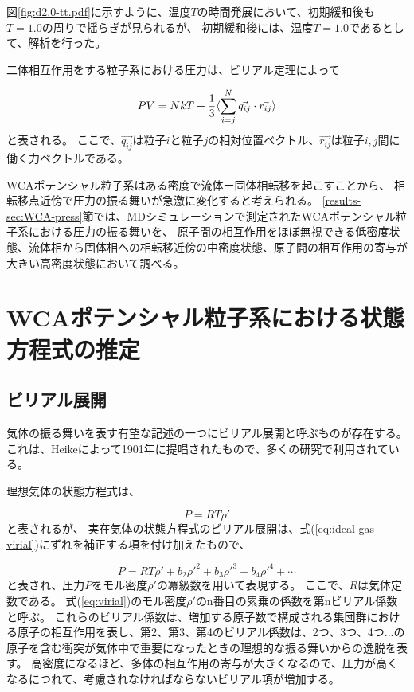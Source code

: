 \documentclass[titlepage]{jsreport}
\begin{document}
{{{図\ref{fig:d2.0-tt.pdf}に示すように、温度$T$の時間発展において、初期緩和後も$T=1.0$の周りで揺らぎが見られるが、
初期緩和後には、温度$T=1.0$であるとして、解析を行った。

\newpage
二体相互作用をする粒子系における圧力は、ビリアル定理によって

\large
\begin{equation}
PV=NkT+{\frac{1}{3}}\langle\sum_{i=j}^N\vec{q_{ij}} \cdot \vec{r_{ij}}\rangle{\label{eq:Theoritical-pressure}}
\end{equation}
\normalsize
と表される\cite{Theoritical-pressure,virial-therom}。
ここで、$\vec{q_{ij}}$は粒子$i$と粒子$j$の相対位置ベクトル、$\vec{r_{ij}}$は粒子$i,j$間に働く力ベクトルである。

WCAポテンシャル粒子系はある密度で流体ー固体相転移を起こすことから、
相転移点近傍で圧力の振る舞いが急激に変化すると考えられる。
\ref{results-sec:WCA-press}節では、MDシミュレーションで測定されたWCAポテンシャル粒子系における圧力の振る舞いを、
原子間の相互作用をほぼ無視できる低密度状態、流体相から固体相への相転移近傍の中密度状態、原子間の相互作用の寄与が大きい高密度状態において調べる。



\section{WCAポテンシャル粒子系における状態方程式の推定}\label{method-sec:WCA-equation}


\subsection{ビリアル展開}\label{method-subsec:virial}
気体の振る舞いを表す有望な記述の一つにビリアル展開と呼ぶものが存在する。
これは、Heikeによって1901年に提唱されたもの\cite{virial-Heike}で、多くの研究で利用されている\cite{virial-expansion-example1,virial-expansion-example2,virial-expansion-example3}。

理想気体の状態方程式は、

\large
\begin{equation}
P=RT{\rho}' \label{eq:ideal-gas-virial}
\end{equation}
\normalsize
と表されるが、
実在気体の状態方程式のビリアル展開は、式(\ref{eq:ideal-gas-virial})にずれを補正する項を付け加えたもので、

\large
\begin{equation}
P=RT{\rho}'+b_2{{\rho}'}^2+b_3{{\rho}'}^3+b_4{{\rho}'}^4+\cdots \label{eq:virial}
\end{equation}
\normalsize
と表され、圧力$P$をモル密度${\rho}'$の冪級数を用いて表現する。
ここで、$R$は気体定数である。
式(\ref{eq:virial})のモル密度${\rho}'$のn番目の累乗の係数を第nビリアル係数と呼ぶ\cite{virial-expansion}。
これらのビリアル係数は、増加する原子数で構成される集団群における原子の相互作用を表し、第2、第3、第4のビリアル係数は、2つ、3つ、4つ...の原子を含む衝突が気体中で重要になったときの理想的な振る舞いからの逸脱を表す。
高密度になるほど、多体の相互作用の寄与が大きくなるので、圧力が高くなるにつれて、考慮されなければならないビリアル項が増加する\cite{virial-Heike}。


}}}
\end{document}
